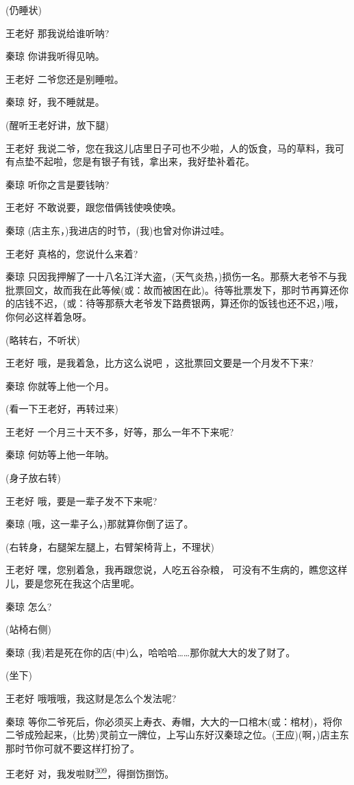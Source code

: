 (仍睡状)

王老好 那我说给谁听呐?

秦琼 你讲我听得见呐。

王老好 二爷您还是别睡啦。

秦琼 好，我不睡就是。

(醒听王老好讲，放下腿)

王老好
我说二爷，您在我这儿店里日子可也不少啦，人的饭食，马的草料，我可有点垫不起啦，您是有银子有钱，拿出来，我好垫补着花。

秦琼 听你之言是要钱呐?

王老好 不敢说要，跟您借俩钱使唤使唤。

秦琼 (店主东，)我进店的时节，(我)也曾对你讲过哇。

王老好 真格的，您说什么来着?

秦琼
只因我押解了一十八名江洋大盗，(天气炎热，)损伤一名。那蔡大老爷不与我批票回文，故而我在此等候(或：故而被困在此)。待等批票发下，那时节再算还你的店钱不迟，(或：待等那蔡大老爷发下路费银两，算还你的饭钱也还不迟，)哦，你何必这样着急呀。

(略转右，不听状)

王老好 哦，是我着急，比方这么说吧 ，这批票回文要是一个月发不下来?

秦琼 你就等上他一个月。

(看一下王老好，再转过来)

王老好 一个月三十天不多，好等，那么一年不下来呢?

秦琼 何妨等上他一年呐。

(身子放右转)

王老好 哦，要是一辈子发不下来呢?

秦琼 (哦，这一辈子么，)那就算你倒了运了。

(右转身，右腿架左腿上，右臂架椅背上，不理状)

王老好 嘿，您别着急，我再跟您说，人吃五谷杂粮，
可没有不生病的，瞧您这样儿，要是您死在我这个店里呢。

秦琼 怎么?

(站椅右侧)

秦琼
(我)若是死在你的店(中)么，哈哈哈\ldots{}\ldots{}那你就大大的发了财了。

(坐下)

王老好 哦哦哦，我这财是怎么个发法呢?

秦琼
等你二爷死后，你必须买上寿衣、寿帽，大大的一口棺木(或：棺材)，将你二爷成殓起来，(比势)灵前立一牌位，上写山东好汉秦琼之位。(王应)(啊，)店主东那时节你可就不要这样打扮了。

王老好
对，我发啦财\protect\hyperlink{fn309}{\textsuperscript{309}}，得捯饬捯饬。

